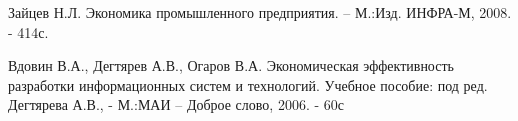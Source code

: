 \item Зайцев Н.Л. Экономика промышленного предприятия. – М.:Изд. 
ИНФРА-М, 2008. - 414с.
\item Вдовин В.А., Дегтярев А.В., Огаров В.А. Экономическая
эффективность разработки информационных систем и технологий. 
Учебное пособие: под ред. Дегтярева А.В., - М.:МАИ – Доброе слово, 
2006. - 60с
